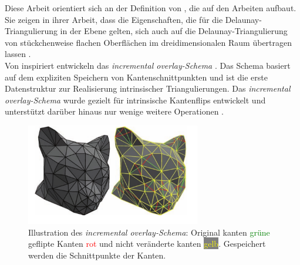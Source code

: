 Diese Arbeit orientiert sich an der Definition von \citet{Bobenko:2007:LaplaceBeltrami}, die auf den Arbeiten  \cite{boris1934delaunay,indermitte:2001:voronoi,lambert:1994:delaunay} aufbaut. Sie zeigen in ihrer Arbeit, dass die Eigenschaften, die für die Delaunay-Triangulierung in der Ebene gelten, sich auch auf die Delaunay-Triangulierung  von stückchenweise flachen Oberflächen \cite[Definiton 1] {Bobenko:2007:LaplaceBeltrami}  im dreidimensionalen Raum übertragen lassen \cite[Definition 3]{Bobenko:2007:LaplaceBeltrami}.\\

Von \citet{Bobenko:2007:LaplaceBeltrami} inspiriert entwickeln \citet{Bobenko:2006:SIGGRAPH} das \textit{incremental overlay-Schema} \cite[Abschnitt 2.3]{Bobenko:2006:SIGGRAPH}. Das Schema basiert auf dem expliziten Speichern von Kantenschnittpunkten und ist die erste Datenstruktur zur Realisierung intrinsischer Triangulierungen. Das \textit{incremental overlay-Schema} wurde gezielt für intrinsische Kantenflips entwickelt und unterstützt darüber hinaus nur wenige weitere Operationen \cite[Abschnitt 2]{Sharp:2019:NIT}. \\
\begin{figure}[h]%
    \centering
  \includegraphics[width=3in]{images/overlaySchema.png}
  \caption{Illustration des \textit{incremental overlay-Schema}:  Original kanten \textcolor{green}{grüne} geflipte Kanten \textcolor{red}{rot} und nicht veränderte kanten \colorbox{gray}{\textcolor{yellow}{gelb}}. Gespeichert werden die Schnittpunkte der Kanten.  \cite{Bobenko:2006:SIGGRAPH}}
\end{figure}
    
